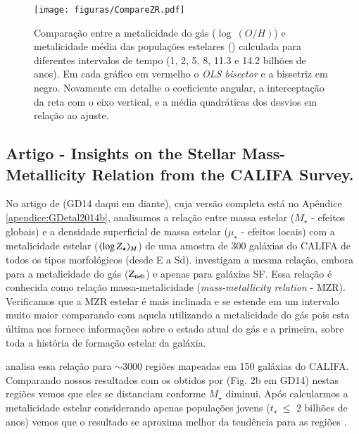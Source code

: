 \begin{figure}
	\centering
	\texttt{[image: figuras/CompareZR.pdf]}
	\caption[ vs. $\log\ (O/H)$ - perfis radiais]
	{Comparação entre a metalicidade do gás ($\log\ (O/H)$) e metalicidade média das populações
estelares () calculada para diferentes intervalos de tempo (1, 2, 5, 8, 11.3 e
14.2 bilhões de anos). Em cada gráfico em vermelho o {\em OLS bisector} e a bissetriz em negro.
Novamente em detalhe o coeficiente angular, a interceptação da reta com o eixo vertical, e a média
quadráticas dos desvios em relação ao ajuste.}
	\label{fig:compareZR}
\end{figure}


\subsection{Artigo - Insights on the Stellar Mass-Metallicity Relation from the CALIFA Survey.}

No artigo de \citet{GonzalezDelgado.etal.2014b} (GD14 daqui em diante), cuja versão completa está no
Apêndice \ref{apendice:GDetal2014b}, analisamos a relação entre massa estelar ($M_\star$ - efeitos
globais) e a densidade superficial de massa estelar ($\mu_\star$ - efeitos locais) com a
metalicidade estelar ($\meanM{\log Z_\star}$) de uma amostra de 300 galáxias do CALIFA de todos os
tipos morfológicos (desde E a Sd). \citet{Tremonti.etal.2004a} investigam a mesma relação, embora
para a metalicidade do gás ($\mathrm{Z}_{\mathrm{neb}}$) e apenas para galáxias SF. Essa relação é conhecida como relação
massa-metalicidade ({\em mass-metallicity relation} - MZR). Verificamos que a MZR estelar é mais
inclinada e se estende em um intervalo muito maior comparando com aquela utilizando a metalicidade
do gás pois esta última nos fornece informações sobre o estado atual do gás e a primeira, sobre toda
a história de formação estelar da galáxia. 

\citet{Sanchez.etal.2013a} analisa essa relação para $\sim 3000$ regiões \Hii mapeadas em 150
galáxias do CALIFA. Comparando nossos resultados com os obtidos por \citeauthor{Sanchez.etal.2013a}
(Fig. 2b em GD14) nestas regiões vemos que eles se distanciam conforme $M_\star$ diminui.
Após calcularmos a metalicidade estelar considerando apenas populações jovens ($t_\star\ \leq$ 2
bilhões de anos) vemos que o resultado se aproxima melhor da tendência para as regiões \Hii.

